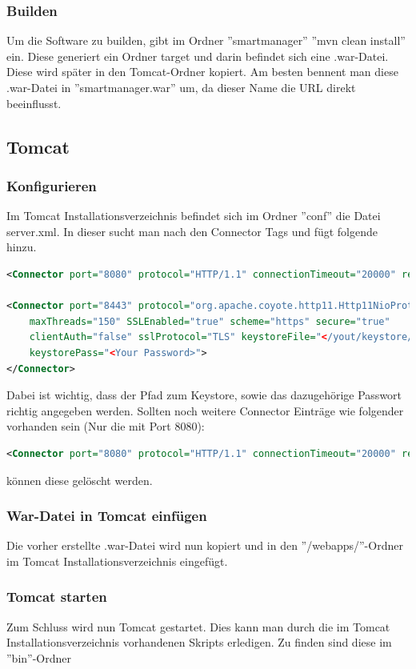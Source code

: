 \subsubsection{Builden}
Um die Software zu builden, gibt im Ordner ''smartmanager'' ''mvn clean install'' ein. Diese generiert ein Ordner target und darin befindet sich eine .war-Datei. Diese wird später in den Tomcat-Ordner kopiert. Am besten bennent man diese .war-Datei in ''smartmanager.war'' um, da dieser Name die URL direkt beeinflusst.

\subsection{Tomcat}
\subsubsection{Konfigurieren}
Im Tomcat Installationsverzeichnis befindet sich im Ordner ''conf'' die Datei server.xml. In dieser sucht man nach den Connector Tags und fügt folgende hinzu.
\begin{lstlisting}[language=xml]
<Connector port="8080" protocol="HTTP/1.1" connectionTimeout="20000" redirectPort="8443" />

<Connector port="8443" protocol="org.apache.coyote.http11.Http11NioProtocol"
	maxThreads="150" SSLEnabled="true" scheme="https" secure="true"
	clientAuth="false" sslProtocol="TLS" keystoreFile="</yout/keystore/path/.keystore>"
	keystorePass="<Your Password>">
</Connector>
\end{lstlisting}

Dabei ist wichtig, dass der Pfad zum Keystore, sowie das dazugehörige Passwort richtig angegeben werden.
Sollten noch weitere Connector Einträge wie folgender vorhanden sein (Nur die mit Port 8080):
\begin{lstlisting}[language=xml]
<Connector port="8080" protocol="HTTP/1.1" connectionTimeout="20000" redirectPort="8443" />
\end{lstlisting}
können diese gelöscht werden.
\subsubsection{War-Datei in Tomcat einfügen}
Die vorher erstellte .war-Datei wird nun kopiert und in den ''/webapps/''-Ordner im Tomcat Installationsverzeichnis eingefügt.
\subsubsection{Tomcat starten}
Zum Schluss wird nun Tomcat gestartet. Dies kann man durch die im Tomcat Installationsverzeichnis vorhandenen Skripts erledigen. Zu finden sind diese im ''bin''-Ordner
